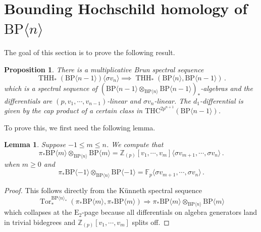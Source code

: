 \documentclass[11pt]{amsart}
\newcommand{\mr}[1]{\mathrm{#1}}
\newcommand{\THC}{\mathrm{THC}}
\newcommand{\BP}{\mr{BP}}
\DeclareMathOperator{\Tor}{Tor}
\DeclareMathOperator{\THH}{THH}
\newtheorem{lemma}[equation]{Lemma}
\newtheorem{proposition}[equation]{Proposition}
\theoremstyle{definition}
\numberwithin{equation}{section}
\numberwithin{figure}{section}
\begin{document}
\section{Bounding Hochschild homology of \texorpdfstring{$\BP\langle n\rangle$}{BP n }}\label{sec:bounding}
The goal of this section is to prove the following result.  
\begin{proposition}\label{prop:brunss}
There is a multiplicative Brun spectral sequence 
\begin{equation}\label{BrunSS}
\THH_*(\BP\langle n-1 \rangle)\langle \sigma v_{n}\rangle \implies \THH_*(\BP\langle n\rangle,\BP\langle n-1\rangle)\,.
\end{equation}
which is a spectral sequence of $(\BP\langle n-1 \rangle\otimes_{\BP\langle n\rangle}\BP\langle n-1 \rangle)_*$-algebras and the differentials are $(p,v_1,\cdots ,v_{n-1})$-linear and $\sigma v_{n}$-linear. The $d_1$-differential is given by the cap product of a certain class in $\THC^{2p^{n+1}}(\BP\langle n-1\rangle)$.  
\end{proposition}

To prove this, we first need the following lemma. 
\begin{lemma}\label{lem:BPn-rel-cooperations}
Suppose $-1\le m\le n$. We compute that 
\[\pi_*\BP\langle m \rangle\otimes_{\BP\langle n\rangle}\BP\langle m \rangle=\mathbb{Z}_{(p)}[v_1,\cdots ,v_{m}]\langle \sigma v_{m+1} , \cdots ,\sigma v_{n} \rangle \,. \]
when $m \geq 0$ and 
\[
\pi_*\BP\langle -1 \rangle\otimes_{\BP\langle n\rangle}\BP\langle -1\rangle=\mathbb{F}_p\langle \sigma v_{m+1} , \cdots ,\sigma v_{n} \rangle \,. 
\]
\end{lemma}
\begin{proof}
This follows directly from the K\"unneth spectral sequence
\[ 
\Tor_*^{\BP\langle n\rangle_*}(\pi_*\BP\langle m\rangle,\pi_*\BP\langle m\rangle)\Longrightarrow \pi_*\BP\langle m\rangle\otimes_{\BP\langle n\rangle}\BP\langle m\rangle
\]
which collapses at the $\mathrm{E}_2$-page because all differentials on algebra generators land in trivial bidegrees and $\mathbb{Z}_{(p)}[v_1,\cdots ,v_{m}]$ splits off. 
\end{proof}
\end{document}
